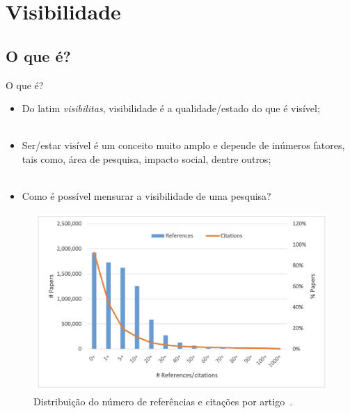 \section{Visibilidade}
\label{s.visibility}

\subsection{O que é?}
\label{ss.what_visibility}

\begin{frame}{O que é?}
	\justify 
	\begin{itemize}
		\item<1> Do latim \textit{visibilitas}, visibilidade é a qualidade/estado do que é visível;
		\\~\\
		\item<2> Ser/estar visível é um conceito muito amplo e depende de inúmeros fatores, tais como, área de pesquisa, impacto social, dentre outros;
		\\~\\
		\item<3> Como é possível mensurar a visibilidade de uma pesquisa?
	\end{itemize}
\end{frame}

\begin{frame}{}
	\centering
	\begin{figure}
		\includegraphics[scale=0.375]{figs/citations_per_paper.png}
		\caption{Distribuição do número de referências e citações por artigo~\cite{Fiala:17}.}
		\label{f.citations_per_paper}
	\end{figure}	
\end{frame}

